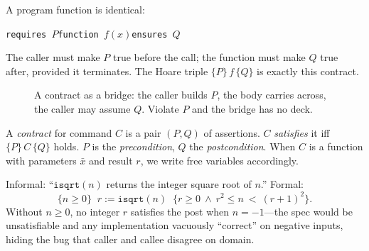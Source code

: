 A program function is identical:
\begin{center}
\texttt{requires $P$}\quad\texttt{function $f(x)$}\quad\texttt{ensures $Q$}
\end{center}
The caller must make $P$ true before the call; the function must make $Q$ true after, provided it terminates. The Hoare triple $\{P\}\,f\,\{Q\}$ is exactly this contract.

\begin{figure}[h]\centering
{}
\caption{A contract as a bridge: the caller builds $P$, the body carries across, the caller may assume $Q$. Violate $P$ and the bridge has no deck.}
\label{fig:contract-bridge}
\end{figure}

\begin{definition}[Contract]
A \emph{contract} for command $C$ is a pair $(P,Q)$ of assertions. $C$ \emph{satisfies} it iff $\{P\}\,C\,\{Q\}$ holds. $P$ is the \emph{precondition}, $Q$ the \emph{postcondition}. When $C$ is a function with parameters $\bar{x}$ and result $r$, we write free variables accordingly.
\end{definition}

\begin{example}
Informal: ``$\texttt{isqrt}(n)$ returns the integer square root of $n$.'' Formal:
\[
\{n\ge0\}\;\; r:=\texttt{isqrt}(n)\;\; \{r\ge0\ \land\ r^2\le n\ <\ (r+1)^2\}.
\]
Without $n\ge0$, no integer $r$ satisfies the post when $n=-1$—the spec would be unsatisfiable and any implementation vacuously ``correct'' on negative inputs, hiding the bug that caller and callee disagree on domain.
\end{example}

